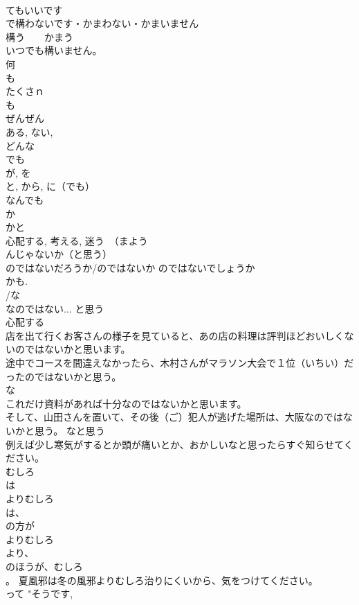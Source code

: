 \documentclass[8pt]{extreport}
\begin{document}
\begin{CJK}{UTF8}{min}
\\	てもいいです 
\\	で構わないです・かまわない・かまいません　 
\\	構う　　かまう 
\\	いつでも構いません。 
\\	何
\\	も	
\\	たくさｎ 
\\	も
\\	ぜんぜん 
\\	ある, ない, 
\\	どんな
\\	でも	
\\	が, を 
\\	と, から, に（でも） 
\\	なんでも 
\\	か
\\	かと
\\	心配する, 考える, 迷う　（まよう 
\\	んじゃないか（と思う）	
\\	のではないだろうか/のではないか のではないでしょうか 
\\	かも. 
\\	/な
\\	なのではない... と思う 
\\	心配する 
\\	店を出て行くお客さんの様子を見ていると、あの店の料理は評判ほどおいしくないのではないかと思います。 
\\	途中でコースを間違えなかったら、木村さんがマラソン大会で１位（いちい）だったのではないかと思う。 
\\	な
\\	これだけ資料があれば十分なのではないかと思います。 
\\	そして、山田さんを置いて、その後（ご）犯人が逃げた場所は、大阪なのではないかと思う。 なと思う 
\\	例えば少し寒気がするとか頭が痛いとか、おかしいなと思ったらすぐ知らせてください。 
\\	むしろ	
\\	は
\\	よりむしろ
\\	は、
\\	の方が
\\	よりむしろ
\\	より、
\\	のほうが、むしろ
\\	。 夏風邪は冬の風邪よりむしろ治りにくいから、気をつけてください。
\\	って	"そうです, 

\end{CJK}
\end{document}
